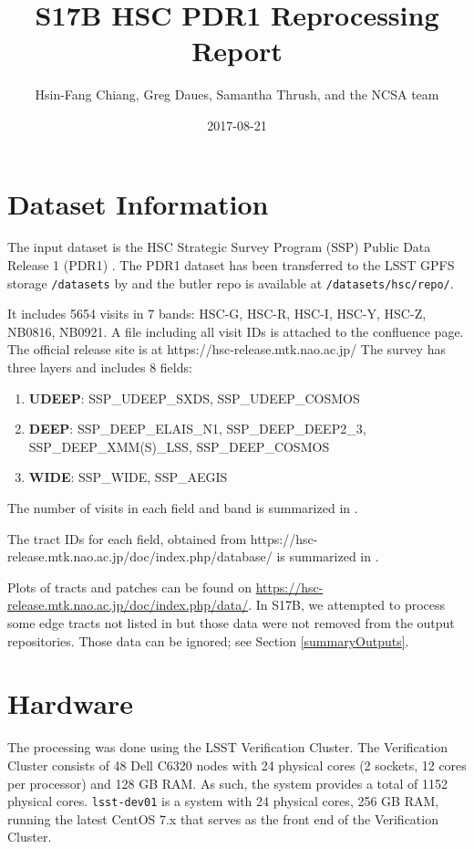 \documentclass[DM,authoryear,toc]{lsstdoc}
\title{S17B HSC PDR1 Reprocessing Report}
\author{%
Hsin-Fang Chiang, Greg Daues, Samantha Thrush, and the NCSA team
}
\date{2017-08-21}
\begin{document}
\maketitle

\section{Dataset Information}
The input dataset is the HSC Strategic Survey Program (SSP) Public Data Release 1 (PDR1) \citep{2017arXiv170208449A}.
The PDR1 dataset has been transferred to the LSST GPFS storage \texttt{/datasets} by  and the butler repo is available at \texttt{/datasets/hsc/repo/}.

It includes 5654 visits in 7 bands: HSC-G, HSC-R, HSC-I, HSC-Y, HSC-Z, NB0816, NB0921. A file including all visit IDs is attached to the confluence page.  The official release site is at https://hsc-release.mtk.nao.ac.jp/
The survey has three layers and includes 8 fields:
\begin{enumerate}
\item
\textbf{UDEEP}: SSP{\_}UDEEP{\_}SXDS, SSP{\_}UDEEP{\_}COSMOS
\item
\textbf{DEEP}: SSP{\_}DEEP{\_}ELAIS{\_}N1, SSP{\_}DEEP{\_}DEEP2{\_}3, SSP{\_}DEEP{\_}XMM(S){\_}LSS, SSP{\_}DEEP{\_}COSMOS
\item
\textbf{WIDE}: SSP{\_}WIDE, SSP{\_}AEGIS
\end{enumerate}

The number of visits in each field and band is summarized in .



The tract IDs for each field, obtained
from https://hsc-release.mtk.nao.ac.jp/doc/index.php/database/
is summarized in .



Plots of tracts and patches can be found on  \url{https://hsc-release.mtk.nao.ac.jp/doc/index.php/data/}.
In S17B, we attempted to process some edge tracts not listed in  but those data were not removed from the output repositories. Those data can be ignored; see Section \ref{summaryOutputs}.

\section{Hardware}
The processing was done using the LSST Verification Cluster.
The Verification Cluster consists of 48 Dell C6320 nodes with 24 physical cores (2 sockets, 12 cores per processor) and 128 GB RAM. As such, the system provides a total of 1152 physical cores.
\texttt{lsst-dev01} is a system with 24 physical cores, 256 GB RAM, running the latest CentOS 7.x that serves as the front end of the Verification Cluster.
\end{document}
